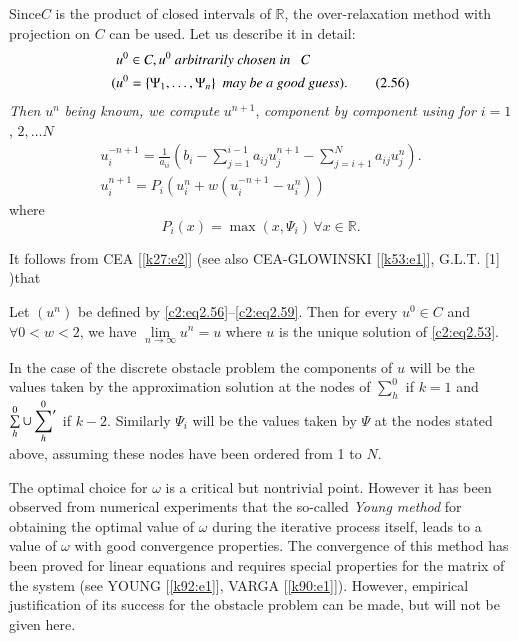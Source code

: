 Since\pageoriginale  $C$ is the product of closed intervals of $\mathbb{R}$, the
over-relaxation method with projection on $C$ can be used. Let us
describe it in detail: 
\begin{align*}
u^0 & \in C, u^0  ~\text{\em arbitrarily chosen in } ~~C \\
(u^0 &  = \{\Psi_1, \ldots, \Psi_n \} ~~\text{\em may be a good
  guess}). \tag{2.56}\label{c2:eq2.56} 
\end{align*}
\textit{Then} $u^n$ \textit{being known, we compute} $u^{n+1}$,
\textit{component by component using for } $i =1$, $2, \ldots N$ 
\begin{align}
u^{-n +1}_{i} = \frac{1}{a_{ii}} \left( b_i - \sum\limits^{i-1}_{j=1}
a_{ij} u^{n+1}_{j} - \sum\limits^{N}_{j=i+1} a_{ij} u^n_j
\right).\tag{2.57}\label{c2:eq2.57}\\ 
u^{n+1}_{i} = P_i (u^n_i + w (u^{-n+1}_{i} -u^n_i))\tag{2.58}\label{c2:eq2.58}  
\end{align}
where 
\begin{equation}
P_i (x) = \max (x, \Psi_i)\, \forall  x \in
\mathbb{R}.\tag{2.59}\label{c2:eq2.59}  
\end{equation}

It follows from CEA [\ref{k27:e2}] (see also CEA-GLOWINSKI
[\ref{k53:e1}], G.L.T. [1] )that 

\begin{proposition}\label{c2:prop2.3}%
Let $(u^n)$ be defined by \eqref{c2:eq2.56}--\eqref{c2:eq2.59}. Then
for every 
$u^0 \in C$ and $\forall 0 < w < 2$, we have $\lim\limits_{n \to
  \infty} u^n = u$ where $u$ is the unique solution of \eqref{c2:eq2.53}. 
\end{proposition}

\begin{remark}\label{c2:rem2.5}%
In the case of the discrete obstacle problem the components of $u$
will be the values taken by  the approximation solution at the nodes
of $\sum\limits^{0}_{h}$ if $k =1$ and $\sum\limits^{0}_{h} \cup
\sideset{}{'}\sum\limits^0_h$  if $k
-2$. Similarly $\Psi_i$ will be the values taken by $\Psi$ at the
nodes stated above, assuming these nodes have been ordered from 1 to
$N$. 
\end{remark}

\begin{remark}\label{c2:rem2.6}%
The optimal choice for $\omega$ is a critical but nontrivial
point. However it has been observed from numerical experiments that
the so-called {\em Young method} for obtaining the optimal value of
$\omega$ during the iterative process itself, leads to a value of
$\omega$ with good convergence properties. The convergence of this
method has been proved for linear equations and requires special
properties for the matrix of the system (see YOUNG  [\ref{k92:e1}], VARGA
[\ref{k90:e1}]). However, empirical justification of its  success for
the obstacle problem can be made, but will not be given here. 
\end{remark}

